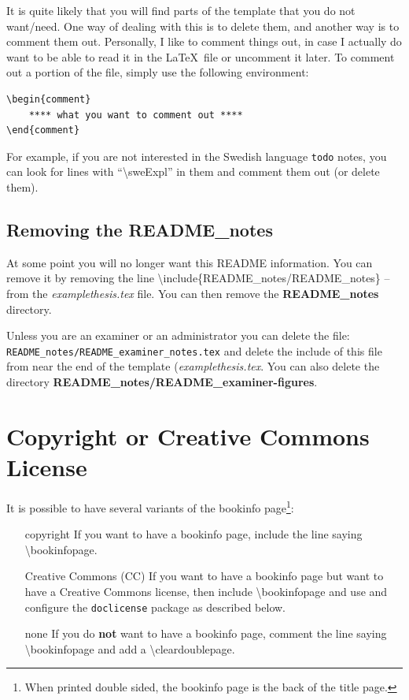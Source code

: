 \documentclass[examplethesis.tex]{subfiles}
\begin{document}
It is quite likely that you will find parts of the template that you do not want/need. One way of dealing with this is to delete them, and another way is to comment them out. Personally, I like to comment things out, in case I actually do want to be able to read it in the \LaTeX\  file or uncomment it later. To comment out a portion of the file, simply use the following environment:

\begin{lstlisting}[style=latexExampleForAuthors]
\begin{comment}
    **** what you want to comment out ****
\end{comment}
\end{lstlisting}

For example, if you are not interested in the Swedish language \texttt{todo} notes, you can look for lines with ``\textbackslash sweExpl'' in them and comment them out (or delete them).

\subsection{Removing the README\_notes}
At some point you will no longer want this README information. You can remove it by removing the line
\textbackslash include\{README\_notes/README\_notes\} -- from the \textit{examplethesis.tex} file. You can then remove the \textbf{README\_notes} directory.

Unless you are an examiner or an administrator you can delete the file: \texttt{README\_notes/README\_examiner\_notes.tex} and delete the include of this file from near the end of the template (\ie \textit{examplethesis.tex}. You can also delete the directory \textbf{README\_notes/README\_examiner-figures}.


\section[Copyright or Creative Commons License]{Copyright or Creative Commons\\ License}
\label{sec:copyrightOrCClicense}
It is possible to have several variants of the bookinfo page\footnote{When printed double sided, the bookinfo page is the back of the title page.}:
\begin{enumerate}[labelwidth =\widthof{\textbf{Creative Commons (CC)}}, leftmargin = !]
    \item[copyright] If you want to have a bookinfo page, include the line saying \textbackslash bookinfopage.
    \item[Creative Commons (CC)] If you want to have a bookinfo page but want to have a Creative Commons license, then include \textbackslash bookinfopage and use and configure the \texttt{doclicense} package as described below.
    \item[none] If you do \textbf{not} want to have a bookinfo page, comment the line saying \textbackslash bookinfopage and add a \textbackslash cleardoublepage.
\end{enumerate}
\end{document}
